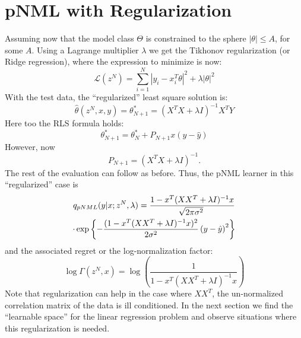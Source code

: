 \documentclass[conference,letterpaper]{IEEEtran}
\begin{document}
\section{pNML with Regularization} \label{sec:pNMLwithReg}
Assuming now that the model class $\Theta$ is constrained to the sphere  $|\theta|\leq A$, for some $A$. Using a Lagrange multiplier $\lambda$ we get the Tikhonov regularization (or Ridge regression), where the expression to minimize is now: 
\begin{equation}
\mathcal{L}(z^N)= \sum_{i=1}^{N}|y_i-x_i^T \theta|^2 + \lambda |\theta|^2
\end{equation}
With the test data, the ``regularized'' least square solution is:
\begin{equation}
\hat{\theta}(z^N,x,y) = \theta_{N+1}^* = (X^T X+ \lambda I)^{-1} X^T Y
\end{equation}
Here too the RLS formula holds: 
\begin{equation}
\theta_{N+1}^*=\theta^*_{N} + P_{N+1} x (y - \hat{y})
\end{equation}
However, now 
\begin{equation}
P_{N+1}= (X^T X+ \lambda I)^{-1}.    
\end{equation}
The rest of the evaluation can follow as before. Thus,
the pNML learner in this ``regularized'' case is 
\begin{multline} \label{eq:pNML_least_sqaures}
q_{\mbox{\tiny{pNML}}}(y|x; z^N, \lambda)
=\frac{1 - x^T (XX^T + \lambda I)^{-1} x }{\sqrt[]{2\pi\sigma^2}} \\
\cdot \exp\left\{-\frac{(1 - x^T (XX^T + \lambda I)^{-1} x )^2 }{2\sigma^2}\left(y- \hat{y} \right)^2\right\} \\
\end{multline}
and the associated regret or the log-normalization factor:
\begin{equation}
\log \Gamma (z^N,x) = \log \left( \frac{1}{1 - x^T (XX^T + \lambda I)^{-1} x } \right)
\end{equation}
Note that regularization can help in the case where $XX^T$, the un-normalized correlation matrix of the data is
ill conditioned. In the next section we find the ``learnable space'' for the linear regression problem and observe situations where this regularization is needed.
\end{document}
